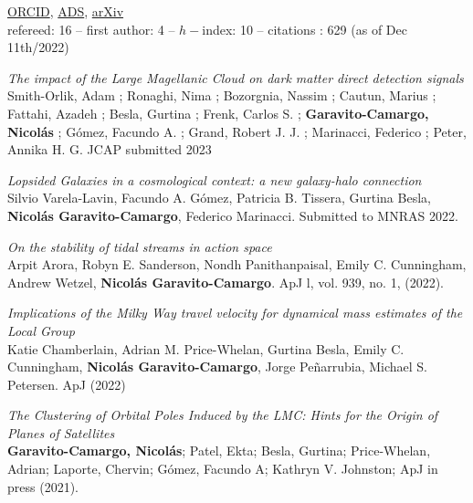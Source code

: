 \documentclass[UTF8]{article}
\begin{document}
\noindent \href{https://orcid.org/0000-0001-7107-1744}{ORCID},
\href{https://ui.adsabs.harvard.edu/search/q=docs(library%2F0X5_bcuLT4iE-6-Nko0kmg)&sort=date%20desc%2C%20bibcode%20desc&p_=0}{ADS},
\href{https://arxiv.org/search/?query=garavito-camargo&searchtype=all}{arXiv}\\
refereed: 16 -- first author: 4 -- $h-$index: 10 -- citations : 629 (as of Dec 11th/2022) 
\begin{etaremune}

\item \textit{The impact of the Large Magellanic Cloud on dark matter direct detection signals}\\
 Smith-Orlik, Adam ; Ronaghi, Nima ; Bozorgnia, Nassim ; Cautun, Marius ; Fattahi, Azadeh ; Besla, Gurtina ; Frenk, Carlos S. ; \textbf{Garavito-Camargo, Nicol\'as} ; Gómez, Facundo A. ; Grand, Robert J. J. ; Marinacci, Federico ; Peter, Annika H. G. JCAP submitted 2023\\

\item \textit{Lopsided Galaxies in a cosmological context: a new galaxy-halo connection}\\ 
Silvio Varela-Lavin, Facundo A. Gómez, Patricia B. Tissera, Gurtina Besla, \textbf{Nicolás Garavito-Camargo}, Federico Marinacci. Submitted to MNRAS 2022.\\ 

\item \textit{On the stability of tidal streams in action space}\\
  Arpit Arora, Robyn E. Sanderson, Nondh Panithanpaisal, Emily C. Cunningham, Andrew Wetzel, \textbf{Nicolás Garavito-Camargo}. ApJ l, vol. 939, no. 1, (2022). 


\item \textit{Implications of the Milky Way travel velocity for dynamical mass
  estimates of the Local Group}\\
  Katie Chamberlain, Adrian M. Price-Whelan, Gurtina Besla, Emily C. Cunningham, \textbf{Nicol\'as Garavito-Camargo}, Jorge Peñarrubia, Michael S. Petersen. ApJ (2022)\\  

\item \textit{The Clustering of Orbital Poles Induced by the LMC: Hints for
      the Origin of Planes of Satellites}\\ 
      \textbf{Garavito-Camargo, Nicol\'as}; Patel, Ekta; Besla, Gurtina; Price-Whelan,
      Adrian; Laporte, Chervin; G\'omez, Facundo A; Kathryn V. Johnston; ApJ
      in press (2021). 



\end{etaremune}
\end{document}
